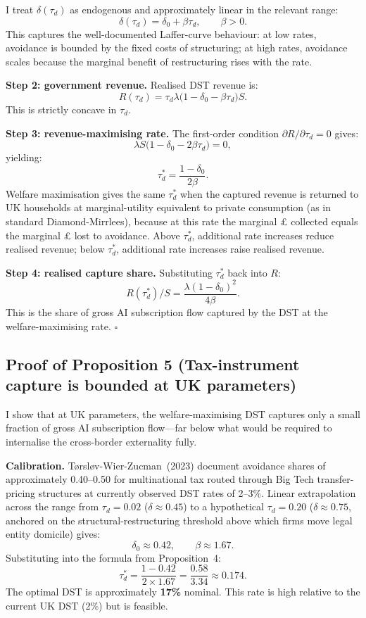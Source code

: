 \documentclass[11pt,letterpaper]{article}
\theoremstyle{remark}
\begin{document}
I treat $\delta(\tau_d)$ as endogenous and approximately linear in the relevant range:
\[
\delta(\tau_d) = \delta_0 + \beta \tau_d, \qquad \beta > 0.
\]
This captures the well-documented Laffer-curve behaviour: at low rates, avoidance is bounded by the fixed costs of structuring; at high rates, avoidance scales because the marginal benefit of restructuring rises with the rate.

\textbf{Step 2: government revenue.} Realised DST revenue is:
\[
R(\tau_d) = \tau_d \lambda \big(1 - \delta_0 - \beta \tau_d\big) S.
\]
This is strictly concave in $\tau_d$.

\textbf{Step 3: revenue-maximising rate.} The first-order condition $\partial R / \partial \tau_d = 0$ gives:
\[
\lambda S \big(1 - \delta_0 - 2\beta \tau_d\big) = 0,
\]
yielding:
\[
\boxed{\tau_d^* = \frac{1 - \delta_0}{2 \beta}.}
\]
Welfare maximisation gives the same $\tau_d^*$ when the captured revenue is returned to UK households at marginal-utility equivalent to private consumption (as in standard Diamond-Mirrlees), because at this rate the marginal £ collected equals the marginal £ lost to avoidance. Above $\tau_d^*$, additional rate increases reduce realised revenue; below $\tau_d^*$, additional rate increases raise realised revenue.

\textbf{Step 4: realised capture share.} Substituting $\tau_d^*$ back into $R$:
\[
R(\tau_d^*)/S = \frac{\lambda (1 - \delta_0)^2}{4\beta}.
\]
This is the share of gross AI subscription flow captured by the DST at the welfare-maximising rate. \hfill$\square$

\subsection*{Proof of Proposition 5 (Tax-instrument capture is bounded at UK parameters)}

I show that at UK parameters, the welfare-maximising DST captures only a small fraction of gross AI subscription flow---far below what would be required to internalise the cross-border externality fully.

\textbf{Calibration.} Tørsløv-Wier-Zucman~(2023) document avoidance shares of approximately 0.40--0.50 for multinational tax routed through Big Tech transfer-pricing structures at currently observed DST rates of 2--3\%. Linear extrapolation across the range from $\tau_d = 0.02$ ($\delta \approx 0.45$) to a hypothetical $\tau_d = 0.20$ ($\delta \approx 0.75$, anchored on the structural-restructuring threshold above which firms move legal entity domicile) gives:
\[
\delta_0 \approx 0.42, \qquad \beta \approx 1.67.
\]
Substituting into the formula from Proposition~4:
\[
\tau_d^* = \frac{1 - 0.42}{2 \times 1.67} = \frac{0.58}{3.34} \approx 0.174.
\]
The optimal DST is approximately \textbf{17\%} nominal. This rate is high relative to the current UK DST (2\%) but is feasible.
\end{document}
